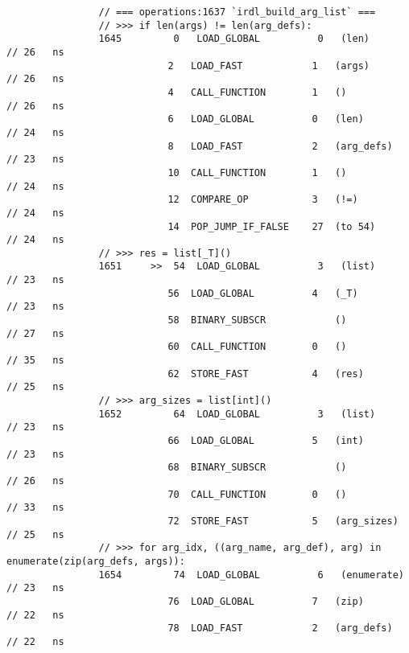 \begin{code}
\begin{verbatim}
                // === operations:1637 `irdl_build_arg_list` ===
                // >>> if len(args) != len(arg_defs):
                1645         0   LOAD_GLOBAL          0   (len)                                     // 26   ns
                            2   LOAD_FAST            1   (args)                                     // 26   ns
                            4   CALL_FUNCTION        1   ()                                         // 26   ns
                            6   LOAD_GLOBAL          0   (len)                                      // 24   ns
                            8   LOAD_FAST            2   (arg_defs)                                 // 23   ns
                            10  CALL_FUNCTION        1   ()                                         // 24   ns
                            12  COMPARE_OP           3   (!=)                                       // 24   ns
                            14  POP_JUMP_IF_FALSE    27  (to 54)                                    // 24   ns
                // >>> res = list[_T]()
                1651     >>  54  LOAD_GLOBAL          3   (list)                                    // 23   ns
                            56  LOAD_GLOBAL          4   (_T)                                       // 23   ns
                            58  BINARY_SUBSCR            ()                                         // 27   ns
                            60  CALL_FUNCTION        0   ()                                         // 35   ns
                            62  STORE_FAST           4   (res)                                      // 25   ns
                // >>> arg_sizes = list[int]()
                1652         64  LOAD_GLOBAL          3   (list)                                    // 23   ns
                            66  LOAD_GLOBAL          5   (int)                                      // 23   ns
                            68  BINARY_SUBSCR            ()                                         // 26   ns
                            70  CALL_FUNCTION        0   ()                                         // 33   ns
                            72  STORE_FAST           5   (arg_sizes)                                // 25   ns
                // >>> for arg_idx, ((arg_name, arg_def), arg) in enumerate(zip(arg_defs, args)):
                1654         74  LOAD_GLOBAL          6   (enumerate)                               // 23   ns
                            76  LOAD_GLOBAL          7   (zip)                                      // 22   ns
                            78  LOAD_FAST            2   (arg_defs)                                 // 22   ns

\end{verbatim}
\end{code}
